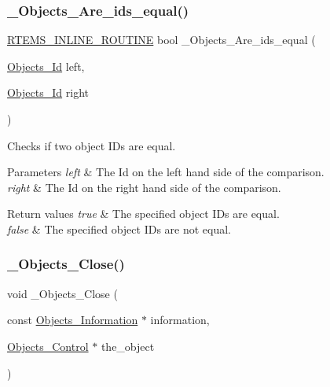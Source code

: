 \subsubsection{\texorpdfstring{\_Objects\_Are\_ids\_equal()}{\_Objects\_Are\_ids\_equal()}}
{\footnotesize\ttfamily \mbox{\hyperlink{group__RTEMSScoreBaseDefs_gac216239df231d5dbd15e3520b0b9313f}{R\+T\+E\+M\+S\+\_\+\+I\+N\+L\+I\+N\+E\+\_\+\+R\+O\+U\+T\+I\+NE}} bool \+\_\+\+Objects\+\_\+\+Are\+\_\+ids\+\_\+equal (\begin{DoxyParamCaption}\item[{\mbox{\hyperlink{group__RTEMSScoreObject_ga5821f52a51072941bdd603e542d0863e}{Objects\+\_\+\+Id}}}]{left,  }\item[{\mbox{\hyperlink{group__RTEMSScoreObject_ga5821f52a51072941bdd603e542d0863e}{Objects\+\_\+\+Id}}}]{right }\end{DoxyParamCaption})}



Checks if two object I\+Ds are equal. 


\begin{DoxyParams}{Parameters}
{\em left} & The Id on the left hand side of the comparison. \\
\hline
{\em right} & The Id on the right hand side of the comparison.\\
\hline
\end{DoxyParams}

\begin{DoxyRetVals}{Return values}
{\em true} & The specified object I\+Ds are equal. \\
\hline
{\em false} & The specified object I\+Ds are not equal. \\
\hline
\end{DoxyRetVals}
\mbox{\label{group__RTEMSScoreObject_ga48be735854a391514fdac4881e9ef8fc}} 
\subsubsection{\texorpdfstring{\_Objects\_Close()}{\_Objects\_Close()}}
{\footnotesize\ttfamily void \+\_\+\+Objects\+\_\+\+Close (\begin{DoxyParamCaption}\item[{const \mbox{\hyperlink{structObjects__Information}{Objects\+\_\+\+Information}} $\ast$}]{information,  }\item[{\mbox{\hyperlink{structObjects__Control}{Objects\+\_\+\+Control}} $\ast$}]{the\+\_\+object }\end{DoxyParamCaption})}



